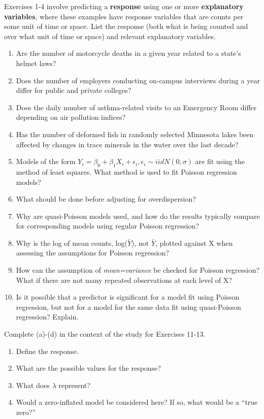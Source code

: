 \documentclass[
]{krantz}
\providecommand{\tightlist}{%
  \setlength{\itemsep}{0pt}\setlength{\parskip}{0pt}}
\begin{document}
Exercises 1-4 involve predicting a \textbf{response} using one or more \textbf{explanatory variables}, where these examples have response variables that are counts per some unit of time or space. List the response (both what is being counted and over what unit of time or space) and relevant explanatory variables.

\begin{enumerate}
\def\labelenumi{\arabic{enumi}.}
\tightlist
\item
  Are the number of motorcycle deaths in a given year related to a state's helmet laws?
\item
  Does the number of employers conducting on-campus interviews during a year differ for public and private colleges?
\item
  Does the daily number of asthma-related visits to an Emergency Room differ depending on air pollution indices?
\item
  Has the number of deformed fish in randomly selected Minnesota lakes been affected by changes in trace minerals in the water over the last decade?
  \vspace{3mm}
\item
  Models of the form \(Y_i=\beta_0+\beta_1X_i+\epsilon_i, \epsilon_i \sim iidN(0,\sigma)\) are fit using the method of least squares. What method is used to fit Poisson regression models?
\item
  What should be done before adjusting for overdispersion?
\item
  Why are quasi-Poisson models used, and how do the results typically compare for corresponding models using regular Poisson regression?
\item
  Why is the log of mean counts, log(\(\bar{Y}\)), not \(\bar{Y}\), plotted against X when assessing the assumptions for Poisson regression?
\item
  How can the assumption of \emph{mean=variance} be checked for Poisson regression? What if there are not many repeated observations at each level of X?
\item
  Is it possible that a predictor is significant for a model fit using Poisson regression, but not for a model for the same data fit using quasi-Poisson regression? Explain.
\end{enumerate}

Complete (a)-(d) in the context of the study for Exercises 11-13.

\begin{enumerate}
\def\labelenumi{\alph{enumi}.}
\tightlist
\item
  Define the response.
\item
  What are the possible values for the response?
\item
  What does \(\lambda\) represent?
\item
  Would a zero-inflated model be considered here? If so, what would be a ``true zero?''
\end{enumerate}
\end{document}
